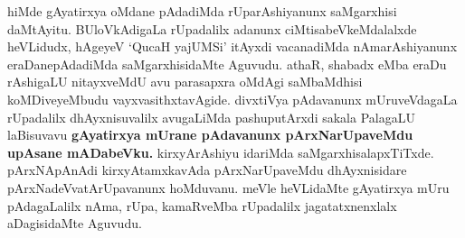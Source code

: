 \begin{artha}
hiMde gAyatirxya oMdane pAdadiMda rUparAshiyanunx saMgarxhisi daMtAyitu. BUloVkAdigaLa rUpadalilx adanunx ciMtisabeVkeMdalalxde heVLidudx, hAgeyeV `QucaH yajUMSi' itAyxdi vacanadiMda nAmarAshiyanunx eraDanepAdadiMda saMgarxhisidaMte Aguvudu. athaR, shabadx eMba eraDu rAshigaLU nitayxveMdU avu parasapxra oMdAgi saMbaMdhisi koMDiveyeMbudu vayxvasithxtavAgide. divxtiVya pAdavanunx mUruveVdagaLa rUpadalilx dhAyxnisuvalilx avugaLiMda pashuputArxdi sakala PalagaLU laBisuvavu \textbf{gAyatirxya mUrane pAdavanunx pArxNarUpaveMdu upAsane mADabeVku.} kirxyArAshiyu idariMda saMgarxhisalapxTiTxde. pArxNApAnAdi kirxyAtamxkavAda pArxNarUpaveMdu dhAyxnisidare pArxNadeVvatArUpavanunx hoMduvanu. meVle heVLidaMte gAyatirxya mUru pAdagaLalilx nAma, rUpa, kamaRveMba rUpadalilx jagatatxnenxlalx aDagisidaMte Aguvudu.
\end{artha}

